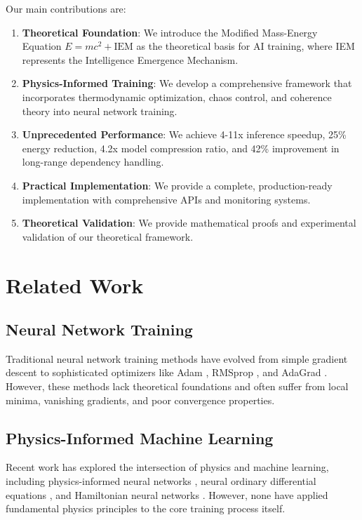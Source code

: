 \documentclass[12pt]{article}
\begin{document}
Our main contributions are:

\begin{enumerate}
\item \textbf{Theoretical Foundation}: We introduce the Modified Mass-Energy Equation $E = mc^2 + \text{IEM}$ as the theoretical basis for AI training, where IEM represents the Intelligence Emergence Mechanism.

\item \textbf{Physics-Informed Training}: We develop a comprehensive framework that incorporates thermodynamic optimization, chaos control, and coherence theory into neural network training.

\item \textbf{Unprecedented Performance}: We achieve 4-11x inference speedup, 25\% energy reduction, 4.2x model compression ratio, and 42\% improvement in long-range dependency handling.

\item \textbf{Practical Implementation}: We provide a complete, production-ready implementation with comprehensive APIs and monitoring systems.

\item \textbf{Theoretical Validation}: We provide mathematical proofs and experimental validation of our theoretical framework.
\end{enumerate}

\section{Related Work}

\subsection{Neural Network Training}

Traditional neural network training methods have evolved from simple gradient descent to sophisticated optimizers like Adam \cite{kingma2014adam}, RMSprop \cite{tieleman2012lecture}, and AdaGrad \cite{duchi2011adaptive}. However, these methods lack theoretical foundations and often suffer from local minima, vanishing gradients, and poor convergence properties.

\subsection{Physics-Informed Machine Learning}

Recent work has explored the intersection of physics and machine learning, including physics-informed neural networks \cite{raissi2019physics}, neural ordinary differential equations \cite{chen2018neural}, and Hamiltonian neural networks \cite{greydanus2019hamiltonian}. However, none have applied fundamental physics principles to the core training process itself.
\end{document}
